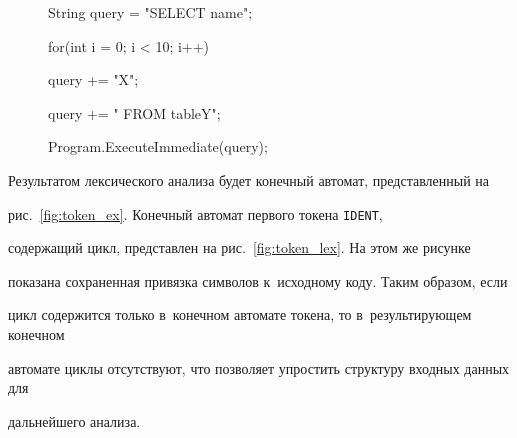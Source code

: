 \begin{figure} %


\begin{center}


\begin{boxedverbatim}


String query = "SELECT name";


for(int i = 0; i < 10; i++){


   query  += "X";


}


query += " FROM tableY";


Program.ExecuteImmediate(query);


\end{boxedverbatim}


\end{center}





\vspace*{-6pt}




\end{figure}





Результатом лексического анализа будет конечный автомат, представленный на 


рис.~\ref{fig:token_ex}. Конечный автомат первого токена \verb"IDENT", 


содержащий цикл, пред\-став\-лен на рис.~\ref{fig:token_lex}. На этом же рисунке 


показана сохраненная привязка символов к~исходному коду. Таким образом, если 


цикл содержится только в~конечном автомате токена, то в~результирующем конечном 


автомате циклы отсутствуют, что позволяет упростить структуру входных данных для 


дальнейшего анализа.





\renewcommand{\figurename}{\protect\bf Рис.}


\setcounter{figure}{7}





